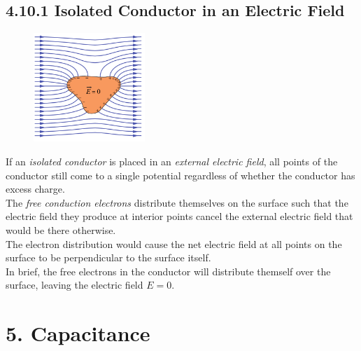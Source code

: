 \documentclass[12pt, a4paper]{article}
\begin{document}
		
		
		\subsection*{4.10.1 Isolated Conductor in an Electric Field}

		\begin{figure}
			\centering
			\includegraphics[width=4.2cm]{Physics2_PNGs/isolated-conduct-elec-field.png}
			\caption*{}
			\label{fig:isolated-conduct-elec-field.png}
		\end{figure}
		If an \textit{isolated conductor} is placed in an \textit{external electric field}, all points of the conductor still come to a single potential regardless of whether the conductor has excess charge. \\
		The \textit{free conduction electrons} distribute themselves on the surface such that the electric field they produce at interior points cancel the external electric field that would be there otherwise.  \\
		The electron distribution would cause the net electric field at all points on the surface to be perpendicular to the surface itself. \\
		In brief, the free electrons in the conductor will distribute themself over the surface, leaving the electric field $E = 0$.
		
		
		
		
		\newpage
		
		\section*{5. Capacitance}
		
\end{document}
